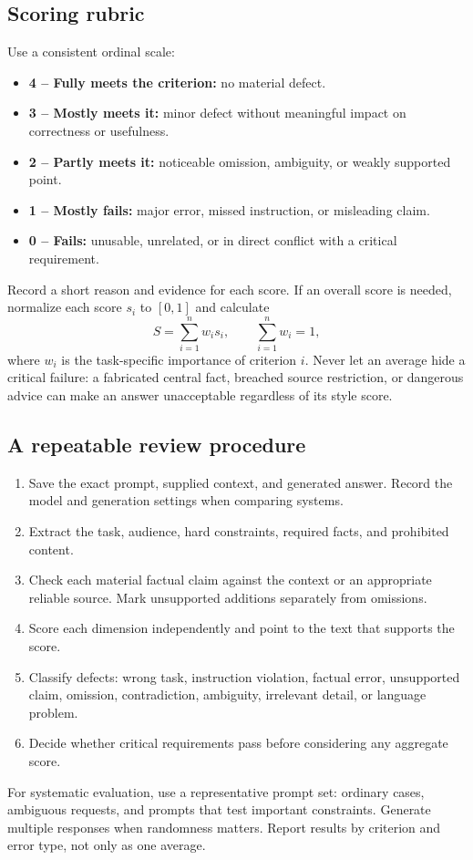 \documentclass[a4paper]{article}
\begin{document}
   \subsection{Scoring rubric}
   Use a consistent ordinal scale:
   \begin{itemize}
      \item \textbf{4 -- Fully meets the criterion:} no material defect.
      \item \textbf{3 -- Mostly meets it:} minor defect without meaningful
      impact on correctness or usefulness.
      \item \textbf{2 -- Partly meets it:} noticeable omission, ambiguity, or
      weakly supported point.
      \item \textbf{1 -- Mostly fails:} major error, missed instruction, or
      misleading claim.
      \item \textbf{0 -- Fails:} unusable, unrelated, or in direct conflict
      with a critical requirement.
   \end{itemize}
   Record a short reason and evidence for each score. If an overall score is
   needed, normalize each score \(s_i\) to \([0,1]\) and calculate
   \[
      S = \sum_{i=1}^{n} w_i s_i,
      \qquad \sum_{i=1}^{n} w_i = 1,
   \]
   where \(w_i\) is the task-specific importance of criterion \(i\). Never let
   an average hide a critical failure: a fabricated central fact, breached
   source restriction, or dangerous advice can make an answer unacceptable
   regardless of its style score.

   \subsection{A repeatable review procedure}
   \begin{enumerate}
      \item Save the exact prompt, supplied context, and generated answer.
      Record the model and generation settings when comparing systems.
      \item Extract the task, audience, hard constraints, required facts, and
      prohibited content.
      \item Check each material factual claim against the context or an
      appropriate reliable source. Mark unsupported additions separately from
      omissions.
      \item Score each dimension independently and point to the text that
      supports the score.
      \item Classify defects: wrong task, instruction violation, factual error,
      unsupported claim, omission, contradiction, ambiguity, irrelevant detail,
      or language problem.
      \item Decide whether critical requirements pass before considering any
      aggregate score.
   \end{enumerate}
   For systematic evaluation, use a representative prompt set: ordinary cases,
   ambiguous requests, and prompts that test important constraints. Generate
   multiple responses when randomness matters. Report results by criterion and
   error type, not only as one average.
\end{document}
